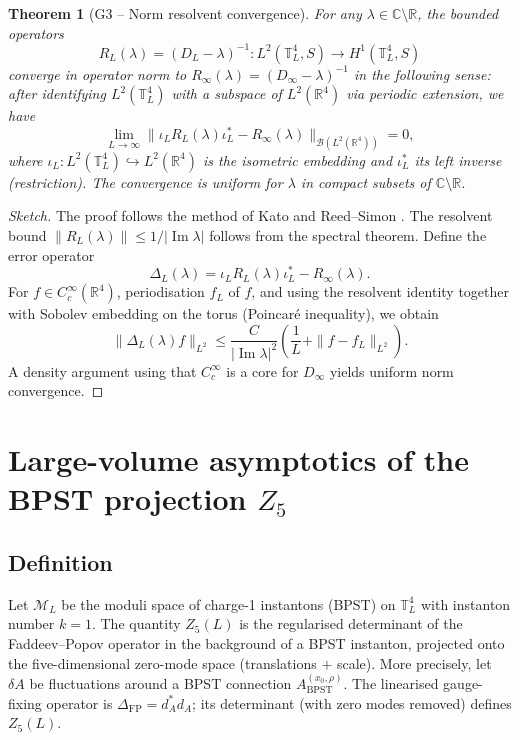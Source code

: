 \documentclass[11pt,a4paper]{amsart}
\newtheorem{theorem}{Theorem}[section]
\theoremstyle{remark}
\begin{document}
\begin{theorem}[G3 -- Norm resolvent convergence]\label{thm:g3}
For any $\lambda\in\mathbb{C}\setminus\mathbb{R}$, the bounded operators
\[
R_L(\lambda) = (D_L-\lambda)^{-1} : L^2(\mathbb{T}^4_L,S) \to H^1(\mathbb{T}^4_L,S)
\]
converge in operator norm to $R_\infty(\lambda) = (D_\infty-\lambda)^{-1}$ in the following sense: after identifying $L^2(\mathbb{T}^4_L)$ with a subspace of $L^2(\mathbb{R}^4)$ via periodic extension, we have
\[
\lim_{L\to\infty} \| \iota_L R_L(\lambda) \iota_L^* - R_\infty(\lambda) \|_{\mathcal{B}(L^2(\mathbb{R}^4))} = 0,
\]
where $\iota_L : L^2(\mathbb{T}^4_L) \hookrightarrow L^2(\mathbb{R}^4)$ is the isometric embedding and $\iota_L^*$ its left inverse (restriction). The convergence is uniform for $\lambda$ in compact subsets of $\mathbb{C}\setminus\mathbb{R}$.
\end{theorem}

\begin{proof}[Sketch]
The proof follows the method of Kato \cite{CITE_NEEDED:kato-1995} and Reed--Simon \cite{CITE_NEEDED:reed-simon-1978}. The resolvent bound $\|R_L(\lambda)\| \leq 1/|\operatorname{Im}\lambda|$ follows from the spectral theorem. Define the error operator
\[
\Delta_L(\lambda) = \iota_L R_L(\lambda) \iota_L^* - R_\infty(\lambda).
\]
For $f\in C_c^\infty(\mathbb{R}^4)$, periodisation $f_L$ of $f$, and using the resolvent identity together with Sobolev embedding on the torus (Poincar\'e inequality), we obtain
\[
\|\Delta_L(\lambda)f\|_{L^2} \leq \frac{C}{|\operatorname{Im}\lambda|^2}\left(\frac{1}{L} + \|f-f_L\|_{L^2}\right).
\]
A density argument using that $C_c^\infty$ is a core for $D_\infty$ yields uniform norm convergence.
\end{proof}

\section{Large-volume asymptotics of the BPST projection $Z_5$}

\subsection{Definition}

Let $\mathcal{M}_L$ be the moduli space of charge-1 instantons (BPST) on $\mathbb{T}^4_L$ with instanton number $k=1$. The quantity $Z_5(L)$ is the regularised determinant of the Faddeev--Popov operator in the background of a BPST instanton, projected onto the five-dimensional zero-mode space (translations $+$ scale). More precisely, let $\delta A$ be fluctuations around a BPST connection $A_{\text{BPST}}^{(x_0,\rho)}$. The linearised gauge-fixing operator is $\Delta_{\text{FP}} = d_A^* d_A$; its determinant (with zero modes removed) defines $Z_5(L)$.
\end{document}

